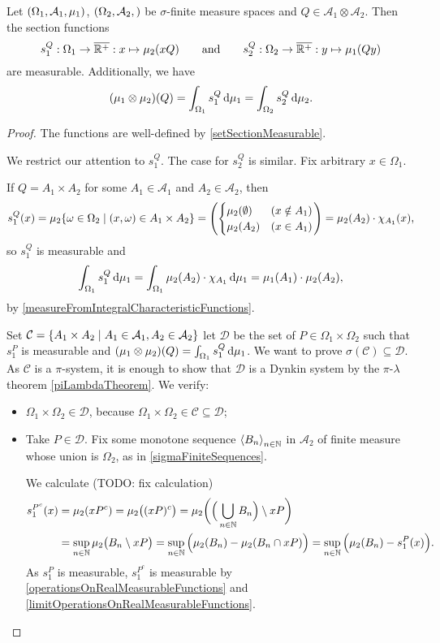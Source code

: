 \begin{lemma} \label{tonelliLemma}
Let $\sSet{\Omega_1, \mathcal{A}_1,\mu_1}$, $\sSet{\Omega_2, \mathcal{A}_2, }$ be $\sigma$-finite measure spaces and $Q\in \mathcal{A}_1\otimes\mathcal{A}_2$. Then the section functions
\[ s_1^Q: \Omega_1 \to \overline{\mathbb{R}^+} :x \mapsto \mu_2(xQ) \qquad\text{and}\qquad s_2^Q: \Omega_2 \to \overline{\mathbb{R}^+} :y \mapsto \mu_1(Qy) \]
are measurable. Additionally, we have
\[ (\mu_1\otimes \mu_2)(Q) = \int_{\Omega_1}s_1^Q\operatorname{d \!}{\mu_1} = \int_{\Omega_2}s_2^Q\operatorname{d \!}{\mu_2}. \]
\end{lemma}
\begin{proof}
The functions are well-defined by \ref{setSectionMeasurable}.

We restrict our attention to $s_1^Q$. The case for $s_2^Q$ is similar. Fix arbitrary $x\in\Omega_1$.

If $Q = A_1\times A_2$ for some $A_1\in\mathcal{A}_1$ and $A_2\in\mathcal{A}_2$, then
\[ s_1^Q(x) = \mu_2\setbuilder{\omega\in\Omega_2}{(x,\omega)\in A_1\times A_2} = \left(\begin{cases}
\mu_2(\emptyset) & (x\notin A_1) \\
\mu_2(A_2) & (x\in A_1)
\end{cases}\right) = \mu_2(A_2)\cdot \chi_{A_1}(x), \]
so $s_1^Q$ is measurable and
\[ \int_{\Omega_1}s_1^Q\operatorname{d \!}{\mu_1} = \int_{\Omega_1}\mu_2(A_2)\cdot \chi_{A_1}\operatorname{d \!}{\mu_1} = \mu_1(A_1)\cdot\mu_2(A_2), \]
by \ref{measureFromIntegralCharacteristicFunctions}.

Set $\mathcal{C} = \setbuilder{A_1\times A_2}{A_1\in\mathcal{A}_1, A_2\in\mathcal{A}_2}$ let $\mathcal{D}$ be the set of $P\in\Omega_1\times\Omega_2$ such that $s_1^P$ is measurable and $(\mu_1\otimes \mu_2)(Q) = \int_{\Omega_1}s_1^Q\operatorname{d \!}{\mu_1}$. We want to prove $\sigma(\mathcal{C}) \subseteq \mathcal{D}$. As $\mathcal{C}$ is a $\pi$-system, it is enough to show that $\mathcal{D}$ is a Dynkin system by the $\pi$-$\lambda$ theorem \ref{piLambdaTheorem}.
We verify:
\begin{itemize}
\item $\Omega_1\times\Omega_2\in\mathcal{D}$, because $\Omega_1\times\Omega_2 \in \mathcal{C}\subseteq \mathcal{D}$;
\item Take $P\in\mathcal{D}$. Fix some monotone sequence $\left\langle B_n \right\rangle_{n\in\mathbb{N}}$ in $\mathcal{A}_2$ of finite measure whose union is $\Omega_2$, as in \ref{sigmaFiniteSequences}. 

We calculate (TODO: fix calculation)
\begin{align*}
s_1^{P^c}(x) &= \mu_2(xP^c) = \mu_2\big((xP)^c\big) = \mu_2\bigg(\Big(\bigcup_{n\in\mathbb{N}} B_n\Big)\setminus xP\bigg) \\
&= \sup_{n\in\mathbb{N}}\mu_2\big(B_n\setminus xP\big) = \sup_{n\in\mathbb{N}}\Big(\mu_2(B_n) - \mu_2(B_n\cap xP)\Big) = \sup_{n\in\mathbb{N}}\Big(\mu_2(B_n) - s_1^P(x)\Big).
\end{align*}
As $s_1^P$ is measurable, $s_1^{P^c}$ is measurable by \ref{operationsOnRealMeasurableFunctions} and \ref{limitOperationsOnRealMeasurableFunctions}.


\end{itemize}
\end{proof}
